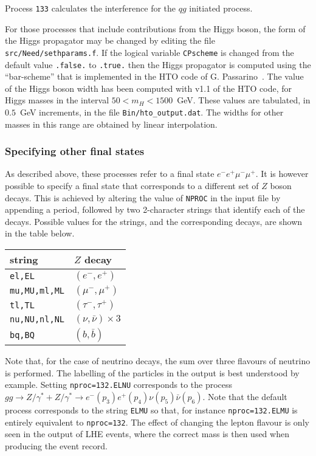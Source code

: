 \documentclass{article}
\begin{document}
Process {\tt 133} calculates the interference for the $qg$ initiated process.

For those processes that include contributions from the Higgs boson, the form
of the Higgs propagator may be changed by editing the file
{\tt src/Need/sethparams.f}.  If the logical variable {\tt CPscheme} is
changed from the default value {\tt .false.} to {\tt .true.} then the
Higgs propagator is computed using the ``bar-scheme'' that is
implemented in the HTO code of G. Passarino~\cite{Goria:2011wa,Passarino:2010qk}.
The value of the Higgs boson width has been computed with v1.1 of the
HTO code, for Higgs masses in the interval $50 < m_H< 1500$~GeV.  These
values are tabulated, in $0.5$~GeV increments, in the file
{\tt Bin/hto\_output.dat}.  The widths for other masses in this range
are obtained by linear interpolation.

\subsubsection{Specifying other final states}
\label{specifyingZdecays}
As described above, these processes refer to a final state 
$e^- e^+ \mu^- \mu^+$.  It is however possible to specify a final state
that corresponds to a different set of $Z$ boson decays.  This is achieved
by altering the value of {\tt NPROC} in the input file by appending a
period, followed by two 2-character strings that identify each of the decays.
Possible values for the strings, and the corresponding decays, are
shown in the table below.
\begin{center}
\begin{tabular}{ll}
string & $Z$ decay \\
\hline
{\tt el,EL} & $(e^-,e^+)$ \\
{\tt mu,MU,ml,ML} & $(\mu^-,\mu^+)$ \\
{\tt tl,TL} & $(\tau^-,\tau^+)$ \\
{\tt nu,NU,nl,NL} & $(\nu,\bar\nu) \times 3$ \\
{\tt bq,BQ} & $(b,\bar b)$ \\
\end{tabular}
\end{center}
Note that, for the case of neutrino decays, the sum over three flavours of
neutrino is performed.  The labelling of the particles in the output is best
understood by example.  Setting {\tt nproc=132.ELNU} corresponds to the
process $gg \to Z/\gamma^*+Z/\gamma^* \to e^-(p_3) e^+(p_4) \nu(p_5) \bar\nu(p_6)$.
Note that the default process corresponds to the string {\tt ELMU} so that,
for instance {\tt nproc=132.ELMU} is entirely equivalent to
{\tt nproc=132}.
The effect of changing the lepton flavour is only seen in the output
of LHE events, where the correct mass is then used when producing the
event record.
\end{document}
